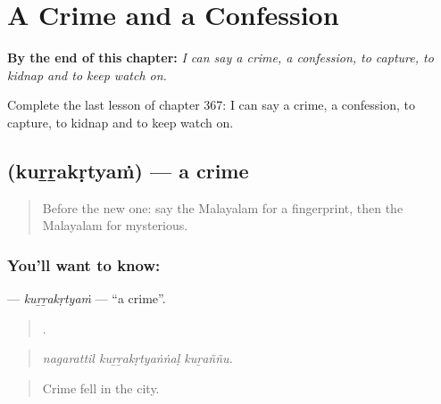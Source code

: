 
\chapter{A Crime and a Confession}
\label{ch:ml-a-crime-and-a-confession}

\begin{chapteropening}
\textbf{By the end of this chapter:} \emph{I can say a crime, a confession, to capture, to kidnap and to keep watch on.}

Complete the last lesson of chapter 367: I can say a crime, a confession, to capture, to kidnap and to keep watch on.
\end{chapteropening}

\section[\texorpdfstring{\ml{കുറ്റകൃത്യം} (kuṟṟakṛtyaṁ)}{കുറ്റകൃത്യം (kuṟṟakṛtyaṁ)}]{ (kuṟṟakṛtyaṁ) — a crime}

\label{lesson:ML-C367-kurrakrtyam}



\begin{quote}
Before the new one: say the Malayalam for a fingerprint, then the Malayalam for mysterious.
\end{quote}

\subsection*{You'll want to know: }
\textbf{} — \emph{kuṟṟakṛtyaṁ} — \textquotedblleft{}a crime\textquotedblright{}.

\begin{quote}
  .
\end{quote}

\begin{quote}
\emph{nagarattil kuṟṟakṛtyaṅṅaḷ kuṟaññu.}
\end{quote}

\begin{quote}
Crime fell in the city.
\end{quote}

